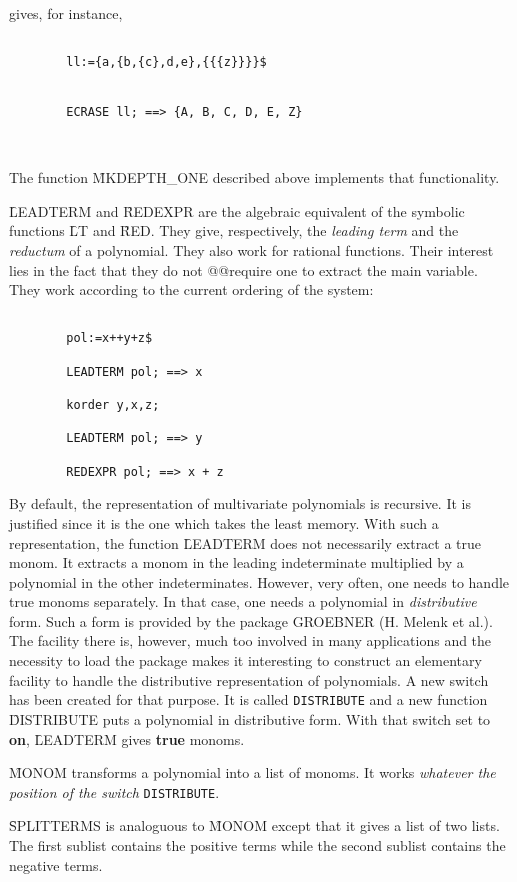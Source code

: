gives, for instance,
\begin{verbatim}

        ll:={a,{b,{c},d,e},{{{z}}}}$


        ECRASE ll; ==> {A, B, C, D, E, Z}



\end{verbatim}
The function \f{MKDEPTH\_ONE} described above implements that functionality.
\item[ii.]
\f{LEADTERM} and \f{REDEXPR} are the algebraic equivalent of the
symbolic functions \f{LT} and \f{RED}. They give, respectively, the
{\em leading term} and the {\em reductum} of a polynomial. They also work
for rational functions. Their interest lies in the fact that they do not
@@require one to extract the main variable. They work according to the current
ordering of the system:
\begin{verbatim}

        pol:=x++y+z$

        LEADTERM pol; ==> x

        korder y,x,z;

        LEADTERM pol; ==> y

        REDEXPR pol; ==> x + z

\end{verbatim}
By default, the representation of multivariate polynomials is recursive.
It is justified since it is the one which takes the least memory.
With such a representation, the function \f{LEADTERM} does not necessarily
extract a true monom. It extracts a monom in the leading indeterminate
multiplied by a polynomial in the other indeterminates. However, very often,
 one needs to handle true monoms separately. In that case, one needs a
polynomial in {\em distributive} form. Such a form is provided by the
package GROEBNER (H. Melenk et al.). The facility there is, however,
much too involved in many applications and the necessity to load the package 
makes it interesting
to construct an elementary facility to handle the distributive representation 
of polynomials. A new switch has been created for that purpose.
It is called {\tt DISTRIBUTE} and a new function \f{DISTRIBUTE} puts a
polynomial in distributive form. With that switch set to {\bf on},
\f{LEADTERM} gives {\bf true} monoms.

\f{MONOM} transforms a polynomial into a list of monoms. It works
{\em whatever the position of the switch} {\tt DISTRIBUTE}.

\f{SPLITTERMS} is analoguous to \f{MONOM} except that it gives
a list of two lists. The first sublist contains the positive terms
while the second sublist contains the negative terms.

